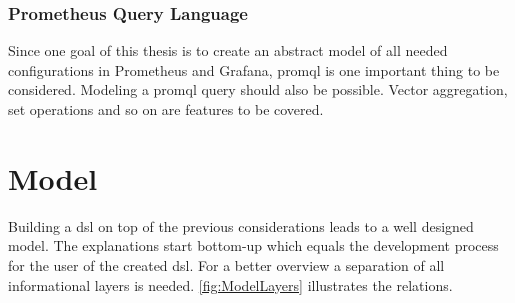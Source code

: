 \subsubsection{Prometheus Query Language}
Since one goal of this thesis is to create an abstract model of all needed configurations in Prometheus and Grafana, \gls{promql} is one important thing to be considered. Modeling a \gls{promql} query should also be possible. Vector aggregation, set operations and so on are features to be covered. 


\section{Model}

Building a \gls{dsl} on top of the previous considerations leads to a well designed model. The explanations start bottom-up which equals the development process for the user of the created \gls{dsl}. For a better overview a separation of all informational layers is needed. \cref{fig:ModelLayers} illustrates the relations.

